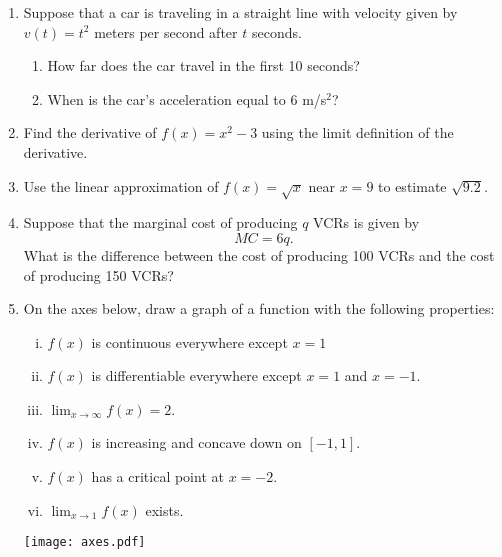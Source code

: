 \documentclass[11pt]{article}
\newcommand{\ds}{\displaystyle}
\begin{document}
\begin{enumerate}
\item Suppose that a car is traveling in a straight line with velocity
  given by $v(t)=t^2$ meters per second after $t$ seconds.
  \begin{enumerate}
  \item How far does the car travel in the first 10 seconds?
    \vfill
  \item When is the car's acceleration equal to $6$ m/s$^2$?
    \vfill
  \end{enumerate}

  \newpage

\item Find the derivative of $f(x)=x^2-3$ using the limit definition
  of the derivative.
  \vfill

\item Use the linear approximation of $f(x)=\sqrt{x}$ near $x=9$ to
  estimate $\sqrt{9.2}$.
  \vfill

  \newpage

\item Suppose that the marginal cost of producing $q$ VCRs is given by
  \[
  MC = 6q.
  \]
  What is the difference between the cost of producing 100 VCRs and
  the cost of producing 150 VCRs?
  \vfill

\item On the axes below, draw a graph of a function with the following
  properties:
  \begin{multicols}{2}
    \begin{enumerate}[(i)]
    \item $f(x)$ is continuous everywhere except $x=1$
    \item $f(x)$ is differentiable everywhere except $x=1$ and $x=-1$.
    \item $\ds\lim_{x\to\infty} f(x) = 2$.
    \item $f(x)$ is increasing and concave down on $[-1,1]$.
    \item $f(x)$ has a critical point at $x=-2$.
    \item $\ds\lim_{x\to 1} f(x)$ exists.
    \end{enumerate}
  \end{multicols}
  \begin{center}
    \texttt{[image: axes.pdf]}
  \end{center}
\end{enumerate}
\end{document}
